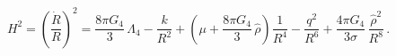 \begin{equation}
H^2=\left(\frac{\dot{R}}{R}\right)^2=\frac{8\pi G_4}{3}\,\Lambda_4-
\frac{k}{R^2}+ \left(\mu+\frac{8\pi G_4}{3}\,\hat{\rho}\right)\frac{1}{R^4}
-\frac{q^2}{R^6}+\frac{4\pi G_4}{3\sigma}\,\frac{\hat{\rho}^2}{R^8}\,.
\end{equation}

